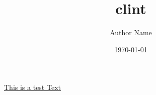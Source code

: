 \documentclass{article}
\title{clint}
\author{Author Name}
\date{\today}
\begin{document}
\maketitle

\underline{This is a test Text}
\end{document}
